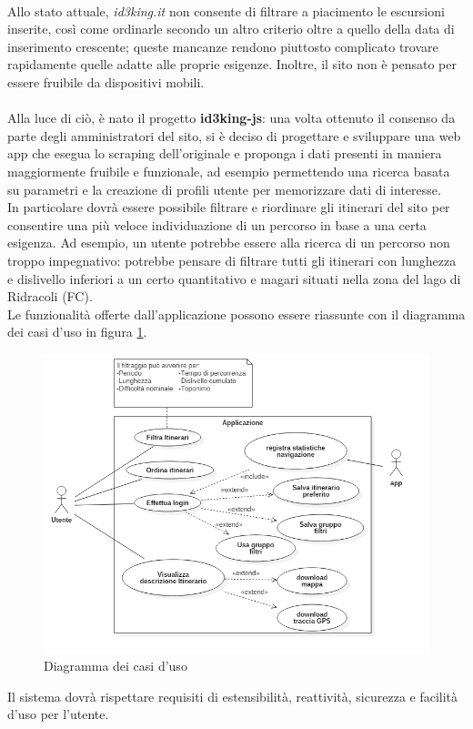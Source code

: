 \documentclass[11pt]{report}
\begin{document}
\\Allo stato attuale, \textit{id3king.it} non consente di filtrare a piacimento le escursioni inserite, così come ordinarle secondo un altro criterio oltre a quello della data di inserimento crescente; queste mancanze rendono piuttosto complicato trovare rapidamente quelle adatte alle proprie esigenze.
Inoltre, il sito non è pensato per essere fruibile da dispositivi mobili.
\\\\Alla luce di ciò, è nato il progetto \textbf{id3king-js}: una volta ottenuto il consenso da parte degli amministratori del sito, si è deciso di progettare e sviluppare una web app che esegua lo scraping dell'originale e proponga i dati presenti in maniera maggiormente fruibile e funzionale, ad esempio permettendo una ricerca basata su parametri e la creazione di profili utente per memorizzare dati di interesse.
\\In particolare dovrà essere possibile filtrare e riordinare gli itinerari del sito per consentire una più veloce individuazione di un percorso in base a una certa esigenza.
Ad esempio, un utente potrebbe essere alla ricerca di un percorso non troppo impegnativo: potrebbe pensare di filtrare tutti gli itinerari con lunghezza e dislivello inferiori a un certo quantitativo e magari situati nella zona del lago di Ridracoli (FC).
\\Le funzionalità offerte dall'applicazione possono essere riassunte con il diagramma dei casi d'uso in figura \ref{use_case_diagram}.
\begin{figure}
	\centering
	\includegraphics[scale=0.5]{use_case_diagram}
	\caption{Diagramma dei casi d'uso \label{use_case_diagram}}
\end{figure}
Il sistema dovrà rispettare requisiti di estensibilità, reattività, sicurezza e facilità d'uso per l'utente.
\pagebreak
\end{document}
